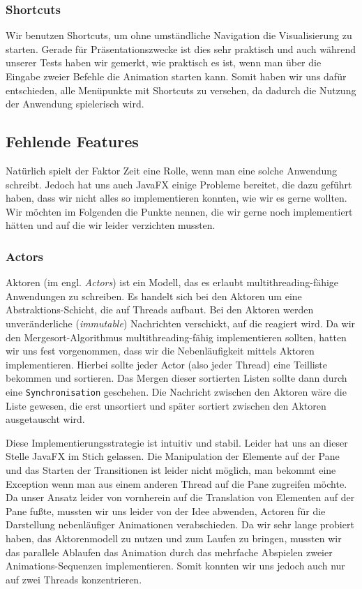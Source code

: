 \subsubsection{Shortcuts}
Wir benutzen Shortcuts, um ohne umständliche Navigation die Visualisierung zu starten. Gerade für Präsentationszwecke ist dies sehr praktisch und auch während unserer Tests haben wir gemerkt, wie praktisch es ist, wenn man über die Eingabe zweier Befehle die Animation starten kann. Somit haben wir uns dafür entschieden, alle Menüpunkte mit Shortcuts zu versehen, da dadurch die Nutzung der Anwendung spielerisch wird.

\subsection{Fehlende Features}
Natürlich spielt der Faktor Zeit eine Rolle, wenn man eine solche Anwendung schreibt. Jedoch hat uns auch JavaFX einige Probleme bereitet, die dazu geführt haben, dass wir nicht alles so implementieren konnten, wie wir es gerne wollten. Wir möchten im Folgenden die Punkte nennen, die wir gerne noch implementiert hätten und auf die wir leider verzichten mussten.

\subsubsection{Actors}\label{sec:probleme-mit-aktoren}
Aktoren (im engl. \textit{Actors}) ist ein Modell, das es erlaubt multithreading-fähige Anwendungen zu schreiben. Es handelt sich bei den Aktoren um eine Abstraktions-Schicht, die auf Threads aufbaut. Bei den Aktoren werden unveränderliche (\textit{immutable}) Nachrichten verschickt, auf die reagiert wird. Da wir den Mergesort-Algorithmus multithreading-fähig implementieren sollten, hatten wir uns fest vorgenommen, dass wir die Nebenläufigkeit mittels Aktoren implementieren. Hierbei sollte jeder Actor (also jeder Thread) eine Teilliste bekommen und sortieren. Das Mergen dieser sortierten Listen sollte dann durch eine \texttt{Synchronisation} geschehen. Die Nachricht zwischen den Aktoren wäre die Liste gewesen, die erst unsortiert und später sortiert zwischen den Aktoren ausgetauscht wird.

Diese Implementierungsstrategie ist intuitiv und stabil. Leider hat uns an dieser Stelle JavaFX im Stich gelassen. Die Manipulation der Elemente auf der Pane und das Starten der Transitionen ist leider nicht möglich, man bekommt eine Exception wenn man aus einem anderen Thread auf die Pane zugreifen möchte. Da unser Ansatz leider von vornherein auf die Translation von Elementen auf der Pane fußte, mussten wir uns leider von der Idee abwenden, Actoren für die Darstellung nebenläufiger Animationen verabschieden. Da wir sehr lange probiert haben, das Aktorenmodell zu nutzen und zum Laufen zu bringen, mussten wir das parallele Ablaufen das Animation durch das mehrfache Abspielen zweier Animations-Sequenzen implementieren. Somit konnten wir uns jedoch auch nur auf zwei Threads konzentrieren.

